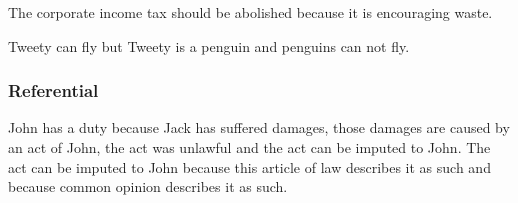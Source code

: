 \begin{exe}
\ex\label{e67} The corporate income tax should be abolished because it is encouraging waste.
\end{exe}

\begin{exe}
\ex\label{e68} Tweety can fly but Tweety is a penguin and penguins can not fly.
\end{exe}

\subsubsection{Referential}
\begin{exe}
\ex\label{e69} John has a duty because Jack has suffered damages, those damages are caused by an act of John, the act was unlawful and the act can be imputed to John. The act can be imputed to John because this article of law describes it as such and because common opinion describes it as such.
\end{exe}